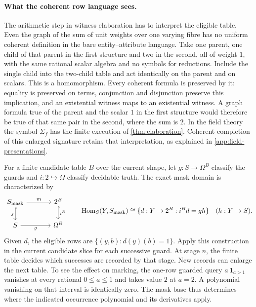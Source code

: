 \documentclass[11pt,a4paper]{article}
\theoremstyle{definition}
\theoremstyle{remark}\newaliascnt{remark}{theorem}
\newcommand{\Hom}{\operatorname{Hom}}
\numberwithin{equation}{section}
\begin{document}
\paragraph{What the coherent row language sees.}\label{sec:coherent-row-language}
The arithmetic step in witness elaboration has to interpret the eligible table. Even the graph of the sum of unit weights over one varying fibre has no uniform coherent definition in the bare entity--attribute language. Take one parent, one child of that parent in the first structure and two in the second, all of weight \(1\), with the same rational scalar algebra and no symbols for reductions. Include the single child into the two-child table and act identically on the parent and on scalars. This is a homomorphism. Every coherent formula is preserved by it: equality is preserved on terms, conjunction and disjunction preserve this implication, and an existential witness maps to an existential witness. A graph formula true of the parent and the scalar \(1\) in the first structure would therefore be true of that same pair in the second, where the sum is \(2\). In the field theory the symbol \(\Sigma_f\) has the finite execution of \cref{thm:elaboration}. Coherent completion of this enlarged signature retains that interpretation, as explained in \cref{app:field-presentations}.

For a finite candidate table \(B\) over the current shape, let \(g:S\to\Omega^B\) classify the guards and \(i:2\hookrightarrow\Omega\) classify decidable truth. The exact mask domain is characterized by
\[
\begin{tikzcd}[column sep=large]
 S_{\rm mask}\arrow[r,"m"]\arrow[d,hook,"j"']&2^B\arrow[d,hook,"i^B"]\\
 S\arrow[r,"g"']&\Omega^B
\end{tikzcd}
\qquad
 \Hom_S(Y,S_{\rm mask})\cong
 \{d:Y\to2^B:i^Bd=g h\}\quad(h:Y\to S).
\]
Given \(d\), the eligible rows are \(\{(y,b):d(y)(b)=1\}\). Apply this construction in the current candidate slice for each successive guard. At stage \(n\), the finite table decides which successes are recorded by that stage. New records can enlarge the next table. To see the effect on marking, the one-row guarded query \(a\,\mathbf1_{a>1}\) vanishes at every rational \(0\le a\le1\) and takes value \(2\) at \(a=2\). A polynomial vanishing on that interval is identically zero. The mask base thus determines where the indicated occurrence polynomial and its derivatives apply.
\end{document}

